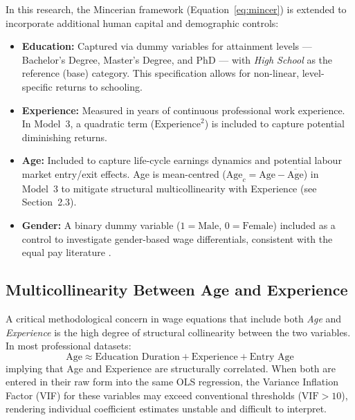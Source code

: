 \documentclass[12pt, a4paper]{article}
\begin{document}
In this research, the Mincerian framework (Equation~\ref{eq:mincer}) is extended to
incorporate additional human capital and demographic controls:

\begin{itemize}[leftmargin=1.5em]
  \item \textbf{Education:} Captured via dummy variables for attainment levels —
        Bachelor's Degree, Master's Degree, and PhD — with \textit{High School} as the
        reference (base) category. This specification allows for non-linear,
        level-specific returns to schooling.

  \item \textbf{Experience:} Measured in years of continuous professional work
        experience. In Model~3, a quadratic term
        ($\text{Experience}^2$) is included to capture potential diminishing returns.

  \item \textbf{Age:} Included to capture life-cycle earnings dynamics and potential
        labour market entry/exit effects. Age is mean-centred
        ($\text{Age}_c = \text{Age} - \overline{\text{Age}}$) in Model~3 to mitigate
        structural multicollinearity with Experience (see Section~2.3).

  \item \textbf{Gender:} A binary dummy variable ($1 = \text{Male}$,
        $0 = \text{Female}$) included as a control to investigate gender-based wage
        differentials, consistent with the equal pay literature \citep{blaukahn2017}.
\end{itemize}

\subsection{Multicollinearity Between Age and Experience}

A critical methodological concern in wage equations that include both \textit{Age} and
\textit{Experience} is the high degree of structural collinearity between the two
variables. In most professional datasets:
\[
  \text{Age} \approx \text{Education Duration} + \text{Experience} + \text{Entry Age}
\]
implying that Age and Experience are structurally correlated. When both are entered in
their raw form into the same OLS regression, the Variance Inflation Factor (VIF) for
these variables may exceed conventional thresholds ($\text{VIF} > 10$), rendering
individual coefficient estimates unstable and difficult to interpret.
\end{document}
